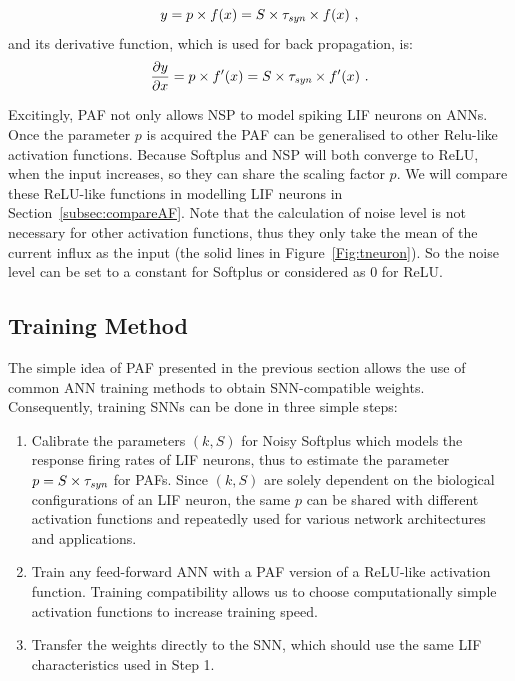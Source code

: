 	\begin{equation}
	y = p \times f(x) = S \times \tau_{\textit{\textrm{syn}}} \times f(x)~,
	\label{equ:PAF}
	\end{equation}
	and its derivative function, which is used for back propagation, is:
	\begin{equation}
	\frac{\partial y}{\partial x} = p \times f'(x) = S \times \tau_{\textit{\textrm{syn}}} \times f'(x)~.
	\end{equation}

	Excitingly, PAF not only allows NSP to model spiking LIF neurons on ANNs.
	Once the parameter $p$ is acquired the PAF can be generalised to other Relu-like activation functions.
	Because Softplus and NSP will both converge to ReLU, when the input increases, so they can share the scaling factor $p$.
	We will compare these ReLU-like functions in modelling LIF neurons in Section~\ref{subsec:compareAF}.
	Note that the calculation of noise level is not necessary for other activation functions, thus they only take the mean of the current influx as the input (the solid lines in Figure~\ref{Fig:tneuron}).
	So the noise level can be set to a constant for Softplus or considered as 0 for ReLU.

	\subsection{Training Method}
	\label{subsec:ns_train}

	The simple idea of PAF presented in the previous section allows the use of common ANN training methods to obtain SNN-compatible weights.
	Consequently, training SNNs can be done in three simple steps: 
	\begin{enumerate}
		\item Calibrate the parameters $(k, S)$ for Noisy Softplus which models the response firing rates of LIF neurons, thus to estimate the parameter $p=S \times \tau_{\textit{\textrm{syn}}}$ for PAFs. Since $(k, S)$ are solely dependent on the biological configurations of an LIF neuron, the same $p$ can be shared with different activation functions and repeatedly used for various network architectures and applications.
		\item Train any feed-forward ANN with a PAF version of a ReLU-like activation function.
		Training compatibility allows us to choose computationally simple activation functions to increase training speed.
		\item Transfer the weights directly to the SNN, which should use the same LIF characteristics used in Step 1.
	\end{enumerate}

